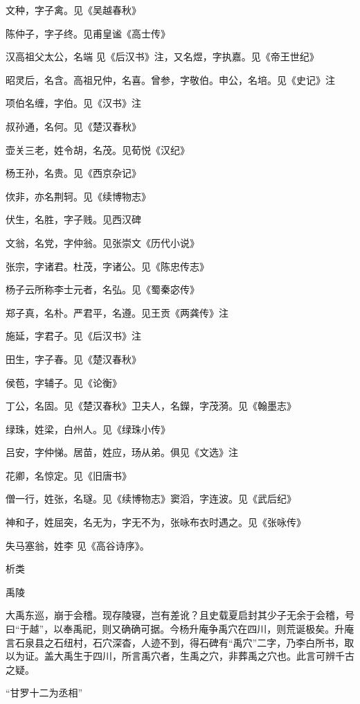 \documentclass[a4paper,12pt,UTF8,twoside]{ctexbook}
\begin{document}
    文种，字子禽。见《吴越春秋》
    
    陈仲子，字子终。见甫皇谧《高士传》
    
    汉高祖父太公，名端 见《后汉书》注，又名煜，字执嘉。见《帝王世纪》
    
    昭灵后，名含。高祖兄仲，名喜。曾参，字敬伯。申公，名培。见《史记》注
    
    项伯名缠，字伯。见《汉书》注
    
    叔孙通，名何。见《楚汉春秋》
    
    壶关三老，姓令胡，名茂。见荀悦《汉纪》
    
    杨王孙，名贵。见《西京杂记》
    
    佽非，亦名荆轲。见《续博物志》
    
    伏生，名胜，字子贱。见西汉碑
    
    文翁，名党，字仲翁。见张崇文《历代小说》
    
    张宗，字诸君。杜茂，字诸公。见《陈忠传志》
    
    杨子云所称李士元者，名弘。见《蜀秦宓传》
    
    郑子真，名朴。严君平，名遵。见王贡《两龚传》注
    
    施延，字君子。见《后汉书》注
    
    田生，字子春。见《楚汉春秋》
    
    侯苞，字辅子。见《论衡》
    
    丁公，名固。见《楚汉春秋》卫夫人，名鑅，字茂漪。见《翰墨志》
    
    绿珠，姓梁，白州人。见《绿珠小传》
    
    吕安，字仲悌。居苗，姓应，玚从弟。俱见《文选》注
    
    花卿，名惊定。见《旧唐书》
    
    僧一行，姓张，名璲。见《续博物志》窦滔，字连波。见《武后纪》
    
    神和子，姓屈突，名无为，字无不为，张咏布衣时遇之。见《张咏传》
    
    失马塞翁，姓李 见《高谷诗序》。
    
    析类
    
    禹陵
    
    大禹东巡，崩于会稽。现存陵寝，岂有差讹？且史载夏启封其少子无余于会稽，号曰“于越”，以奉禹祀，则又确确可据。今杨升庵争禹穴在四川，则荒诞极矣。升庵言石泉县之石纽村，石穴深杳，人迹不到，得石碑有“禹穴”二字，乃李白所书，取以为证。盖大禹生于四川，所言禹穴者，生禹之穴，非葬禹之穴也。此言可辨千古之疑。
    
    “甘罗十二为丞相”
    
\end{document}
